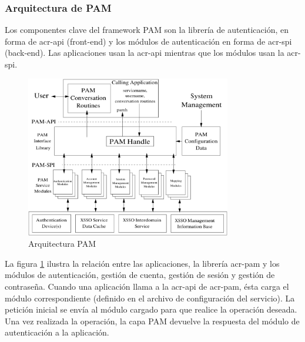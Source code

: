 \documentclass[twoside, titlepage, 12pt, a4paper]{article}
\begin{document}
\subsubsection{Arquitectura de PAM}
Los componentes clave del framework PAM son la librería de autenticación, en forma de \gls{acr-api} (\gls{front-end}) y los módulos de autenticación en forma de \gls{acr-spi} (\gls{back-end}). Las aplicaciones usan la \gls{acr-api} mientras que los módulos usan la \gls{acr-spi}.
\begin{figure}[H]
    \centering
    \includegraphics[width=0.8\textwidth]{Media/PAMFramework.png}
    \caption{Arquitectura PAM}
    \label{fig:arquitecturaPAM}
\end{figure}
La figura \ref{fig:arquitecturaPAM} ilustra la relación entre las aplicaciones, la librería \gls{acr-pam} y los módulos de autenticación, gestión de cuenta, gestión de sesión y gestión de contraseña. Cuando una aplicación llama a la \gls{acr-api} de \gls{acr-pam}, ésta carga el módulo correspondiente (definido en el archivo de configuración del servicio). La petición inicial se envía al módulo cargado para que realice la operación deseada. Una vez realizada la operación, la capa PAM devuelve la respuesta del módulo de autenticación a la aplicación\cite{PAM}.
\end{document}
